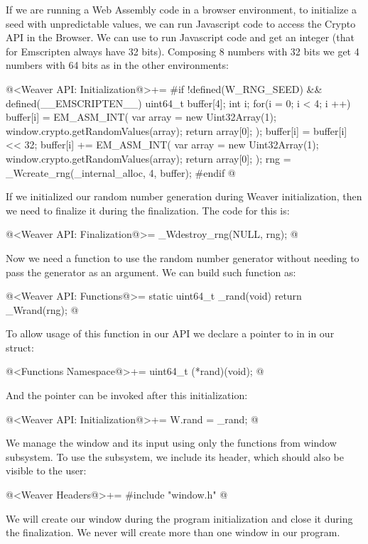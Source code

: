 If we are running a Web Assembly code in a browser environment, to
initialize a seed with unpredictable values, we can run Javascript
code to access the Crypto API in the Browser. We can
use  to run Javascript code and get an
integer (that for Emscripten always have 32 bits). Composing 8 numbers
with 32 bits we get 4 numbers with 64 bits as in the other
environments:

\iniciocodigo
@<Weaver API: Initialization@>+=
#if !defined(W_RNG_SEED) && defined(__EMSCRIPTEN__)
{
  uint64_t buffer[4];
  int i;
  for(i = 0; i < 4; i ++){
    buffer[i] = EM_ASM_INT({
      var array = new Uint32Array(1);
      window.crypto.getRandomValues(array);
      return array[0];
    });
    buffer[i] = buffer[i] << 32;
    buffer[i] += EM_ASM_INT({
      var array = new Uint32Array(1);
      window.crypto.getRandomValues(array);
      return array[0];
    });
  }
  rng = _Wcreate_rng(_internal_alloc, 4, buffer);
}
#endif
@
\fimcodigo

If we initialized our random number generation during Weaver
initialization, then we need to finalize it during the
finalization. The code for this is:

\iniciocodigo
@<Weaver API: Finalization@>=
_Wdestroy_rng(NULL, rng);
@
\fimcodigo

Now we need a function to use the random number generator without
needing to pass the generator as an argument. We can build such
function as:

\iniciocodigo
@<Weaver API: Functions@>=
static uint64_t _rand(void){
  return _Wrand(rng);
}
@
\fimcodigo

To allow usage of this function in our API we declare a pointer to in
in our  struct:

\iniciocodigo
@<Functions Namespace@>+=
uint64_t (*rand)(void);
@
\fimcodigo

And the pointer can be invoked after this initialization:

\iniciocodigo
@<Weaver API: Initialization@>+=
W.rand = _rand;
@
\fimcodigo


We manage the window and its input using only the functions from
window subsystem. To use the subsystem, we include its header, which
should also be visible to the user:

\iniciocodigo
@<Weaver Headers@>+=
#include "window.h"
@
\fimcodigo

We will create our window during the program initialization and close
it during the finalization. We never will create more than one window
in our program.

